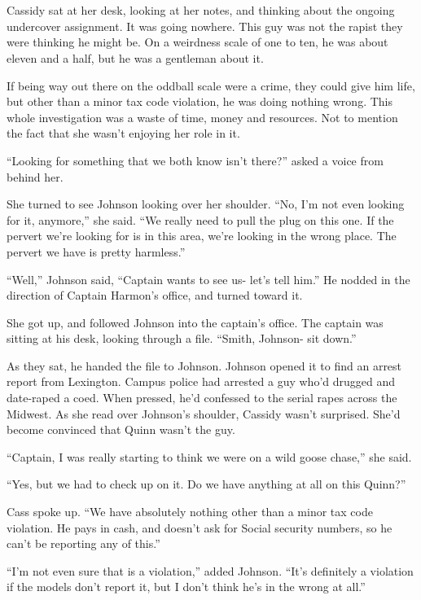 \chapter{}
Cassidy sat at her desk, looking at her notes, and thinking about the ongoing undercover
assignment. It was going nowhere. This guy was not the rapist they were thinking he might be. On
a weirdness scale of one to ten, he was about eleven and a half, but he was a gentleman about
it.

If being way out there on the oddball scale were a crime, they could give him life, but
other than a minor tax code violation, he was doing nothing wrong. This whole investigation was
a waste of time, money and resources. Not to mention the fact that she wasn't enjoying her role
in it.

``Looking for something that we both know isn't there?'' asked a voice from behind her.

She turned to see Johnson looking over her shoulder. ``No, I'm not even looking for it,
anymore,'' she said. ``We really need to pull the plug on this one. If the pervert we're looking
for is in this area, we're looking in the wrong place. The pervert we have is pretty harmless.''

``Well,'' Johnson said, ``Captain wants to see us- let's tell him.'' He nodded in the direction
of Captain Harmon's office, and turned toward it.

She got up, and followed Johnson into the captain's office. The captain was sitting at his
desk, looking through a file. ``Smith, Johnson- sit down.''

As they sat, he handed the file to Johnson. Johnson opened it to find an arrest report from
Lexington. Campus police had arrested a guy who'd drugged and date-raped a coed. When pressed,
he'd confessed to the serial rapes across the Midwest. As she read over Johnson's shoulder,
Cassidy wasn't surprised. She'd become convinced that Quinn wasn't the guy.

``Captain, I was really starting to think we were on a wild goose chase,'' she said.

``Yes, but we had to check up on it. Do we have anything at all on this Quinn?''

Cass spoke up. ``We have absolutely nothing other than a minor tax code violation. He pays
in cash, and doesn't ask for Social security numbers, so he can't be reporting any of this.''

``I'm not even sure that is a violation,'' added Johnson. ``It's definitely a violation if the
models don't report it, but I don't think he's in the wrong at all.''

